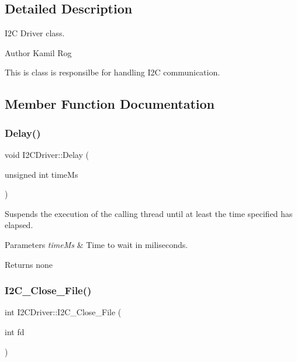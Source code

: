\subsection{Detailed Description}
I2C Driver class. 

\begin{DoxyAuthor}{Author}
Kamil Rog
\end{DoxyAuthor}
This is class is responsilbe for handling I2C communication. 

\subsection{Member Function Documentation}
\mbox{\label{classI2CDriver_a01453a7adeb358f269faabb33953eee0}} 
\subsubsection{\texorpdfstring{Delay()}{Delay()}}
{\footnotesize\ttfamily void I2\+C\+Driver\+::\+Delay (\begin{DoxyParamCaption}\item[{unsigned int}]{time\+Ms }\end{DoxyParamCaption})}

Suspends the execution of the calling thread until at least the time specified has elapsed.


\begin{DoxyParams}{Parameters}
{\em time\+Ms} & Time to wait in miliseconds.\\
\hline
\end{DoxyParams}
\begin{DoxyReturn}{Returns}
none 
\end{DoxyReturn}
\mbox{\label{classI2CDriver_a6480a0e3e5022ac90944f319ca5a5f4e}} 
\subsubsection{\texorpdfstring{I2\+C\+\_\+\+Close\+\_\+\+File()}{I2C\_Close\_File()}}
{\footnotesize\ttfamily int I2\+C\+Driver\+::\+I2\+C\+\_\+\+Close\+\_\+\+File (\begin{DoxyParamCaption}\item[{int}]{fd }\end{DoxyParamCaption})}

